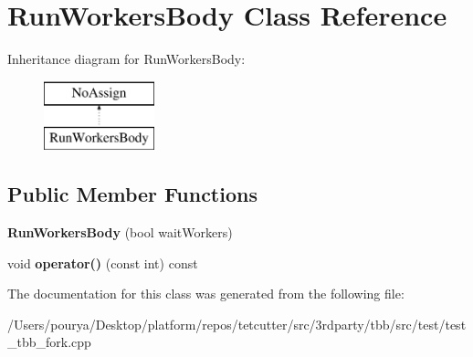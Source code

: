 \hypertarget{classRunWorkersBody}{}\section{Run\+Workers\+Body Class Reference}
\label{classRunWorkersBody}
Inheritance diagram for Run\+Workers\+Body\+:\begin{figure}[H]
\begin{center}
\leavevmode
\includegraphics[height=2.000000cm]{classRunWorkersBody}
\end{center}
\end{figure}
\subsection*{Public Member Functions}
\begin{DoxyCompactItemize}
\item 
\hypertarget{classRunWorkersBody_a2954e826e57c1e524720d85918f9df6d}{}{\bfseries Run\+Workers\+Body} (bool wait\+Workers)\label{classRunWorkersBody_a2954e826e57c1e524720d85918f9df6d}

\item 
\hypertarget{classRunWorkersBody_ab714b233ef3f52c8ae9fc9147d4bdfff}{}void {\bfseries operator()} (const int) const \label{classRunWorkersBody_ab714b233ef3f52c8ae9fc9147d4bdfff}

\end{DoxyCompactItemize}


The documentation for this class was generated from the following file\+:\begin{DoxyCompactItemize}
\item 
/\+Users/pourya/\+Desktop/platform/repos/tetcutter/src/3rdparty/tbb/src/test/test\+\_\+tbb\+\_\+fork.\+cpp\end{DoxyCompactItemize}
